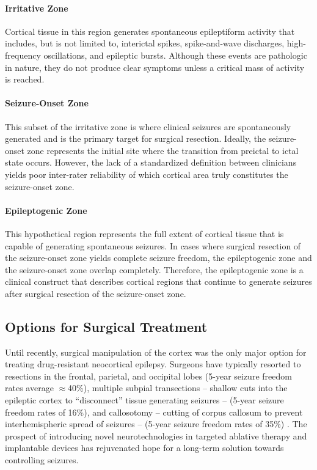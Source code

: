 \paragraph{Irritative Zone}
Cortical tissue in this region generates spontaneous epileptiform activity that includes, but is not limited to, interictal spikes, spike-and-wave discharges, high-frequency oscillations, and epileptic bursts. Although these events are pathologic in nature, they do not produce clear symptoms unless a critical mass of activity is reached.

\paragraph{Seizure-Onset Zone}
This subset of the irritative zone is where clinical seizures are spontaneously generated and is the primary target for surgical resection. Ideally, the seizure-onset zone represents the initial site where the transition from preictal to ictal state occurs. However, the lack of a standardized definition between clinicians yields poor inter-rater reliability of which cortical area truly constitutes the seizure-onset zone.

\paragraph{Epileptogenic Zone}
This hypothetical region represents the full extent of cortical tissue that is capable of generating spontaneous seizures. In cases where surgical resection of the seizure-onset zone yields complete seizure freedom, the epileptogenic zone and the seizure-onset zone overlap completely. Therefore, the epileptogenic zone is a clinical construct that describes cortical regions that continue to generate seizures after surgical resection of the seizure-onset zone.

\subsection{Options for Surgical Treatment}
Until recently, surgical manipulation of the cortex was the only major option for treating drug-resistant neocortical epilepsy. Surgeons have typically resorted to resections in the frontal, parietal, and occipital lobes (5-year seizure freedom rates average $\approx$40\%), multiple subpial transections -- shallow cuts into the epileptic cortex to ``disconnect'' tissue generating seizures -- (5-year seizure freedom rates of 16\%), and callosotomy -- cutting of corpus callosum to prevent interhemispheric spread of seizures -- (5-year seizure freedom rates of 35\%) \cite{tellez-zenteno2005long-term}.  The prospect of introducing novel neurotechnologies in targeted ablative therapy and implantable devices has rejuvenated hope for a long-term solution towards controlling seizures.

